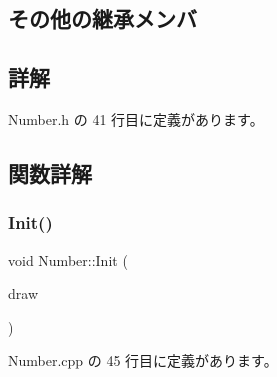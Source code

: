 \subsection*{その他の継承メンバ}


\subsection{詳解}


 Number.\+h の 41 行目に定義があります。



\subsection{関数詳解}
\mbox{\label{class_number_ad92c9038810d0f831fdb9b5b13901b79}} 
\subsubsection{\texorpdfstring{Init()}{Init()}}
{\footnotesize\ttfamily void Number\+::\+Init (\begin{DoxyParamCaption}\item[{\mbox{\hyperlink{class_draw_base}{Draw\+Base}} $\ast$}]{draw }\end{DoxyParamCaption})}



 Number.\+cpp の 45 行目に定義があります。

